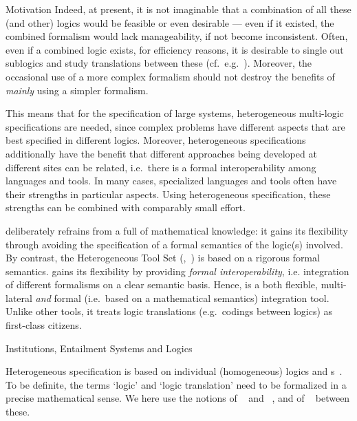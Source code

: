 \begin{omgroup}[short=\hets,
   creators={mossakowski,maeder,luettich}]
\begin{omgroup}{Motivation}
Indeed, at present, it is not imaginable that a combination of all these (and other)
logics would be feasible or even desirable --- even if it existed, the combined formalism
would lack manageability, if not become inconsistent. Often, even if a combined logic
exists, for efficiency reasons, it is desirable to single out sublogics and study
translations between these (cf.\ e.g.~\cite{Schneider04}).  Moreover, the occasional use
of a more complex formalism should not destroy the benefits of \emph{mainly} using a
simpler formalism.

This means that for the specification of large systems, heterogeneous multi-logic
specifications are needed, since complex problems have
different aspects that are best specified in different logics.  Moreover, heterogeneous
specifications additionally have the benefit that different approaches being developed at
different sites can be related, i.e.\ there is a formal interoperability among languages
and tools.  In many cases, specialized languages and tools often have their strengths in
particular aspects. Using heterogeneous specification, these strengths can be combined
with comparably small effort.

{\omdoc} deliberately refrains from a full {} of mathematical
knowledge: it gains its flexibility through avoiding the specification of a formal
semantics of the logic(s) involved. By contrast, the Heterogeneous Tool Set
({\hets},~\cite{hets06}) is based on a rigorous formal semantics. {\hets} gains its
flexibility by providing \emph{formal interoperability}, i.e. integration of different
formalisms on a clear semantic basis.  Hence, {\hets} is a both flexible, multi-lateral
\emph{and} formal (i.e.\ based on a mathematical semantics) integration tool. Unlike other
tools, it treats logic translations (e.g.\ codings between logics) as first-class
citizens.
\end{omgroup}

\begin{omgroup}{Institutions, Entailment Systems and Logics}

Heterogeneous specification is based on individual (homogeneous) logics and
{s}~\cite{MossakowskiHabil}. To be definite, the terms `logic'
and `logic translation' need to be formalized in a precise mathematical sense.  We here
use the notions of {\emph{}}~\cite{GoguenBurstall92} and
{\emph{}}~\cite{Meseguer89}, and of
{\emph{}}~\cite{GoguenRosu02} between these.


\end{omgroup}
\end{omgroup}
